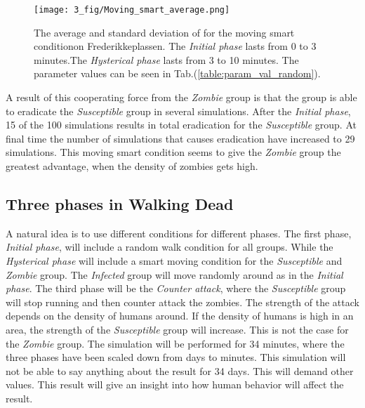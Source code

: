 \documentclass[%
twoside,                 %
final,                   %
chapterprefix=true,      %
open=right               %
10pt]{book}
\begin{document}
\vspace{3mm}




\vspace{3mm}




\begin{figure}[ht]
  \centerline{\texttt{[image: 3\_fig/Moving\_smart\_average.png]}}
  \caption{
  \label{fig:average_moving_smart} The average and standard deviation of for the moving smart conditionon Frederikkeplassen. The \emph{Initial phase} lasts from 0 to 3 minutes.The \emph{Hysterical phase} lasts from 3 to 10 minutes. The parameter values can be seen in Tab.(\ref{table:param_val_random}).
  }
\end{figure}


A result of this cooperating force from the \emph{Zombie} group is that the group is able to eradicate the \emph{Susceptible} group in several simulations. After the \emph{Initial phase}, 15 of the 100 simulations results in total eradication for the \emph{Susceptible} group. At final time the number of simulations that causes eradication have increased to 29 simulations. This moving smart condition seems to give the \emph{Zombie} group the greatest advantage, when the density of zombies gets high.

\subsection{Three phases in Walking Dead}
A natural idea is to use different conditions for different phases. The first phase, \emph{Initial phase}, will include a random walk condition for all groups. While the \emph{Hysterical phase} will include a smart moving condition for the \emph{Susceptible} and \emph{Zombie} group. The \emph{Infected} group will move randomly around as in the \emph{Initial phase}. The third phase will be the \emph{Counter attack}, where the \emph{Susceptible} group will stop running and then counter attack the zombies. The strength of the attack depends on the density of humans around. If the density of humans is high in an area, the strength of the \emph{Susceptible} group will increase. This is not the case for the \emph{Zombie} group. The simulation will be performed for 34 minutes, where the three phases have been scaled down from days to minutes. This simulation will not be able to say anything about the result for 34 days. This will demand other values. This result will give an insight into how human behavior will affect the result.  
\end{document}

